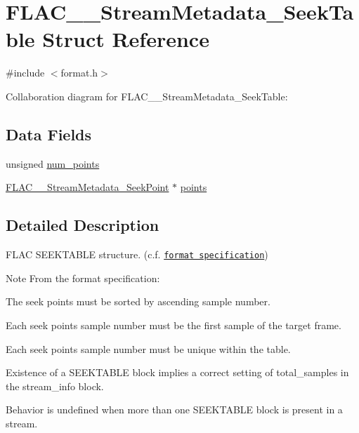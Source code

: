 \hypertarget{struct_f_l_a_c_____stream_metadata___seek_table}{}\section{F\+L\+A\+C\+\_\+\+\_\+\+Stream\+Metadata\+\_\+\+Seek\+Table Struct Reference}
\label{struct_f_l_a_c_____stream_metadata___seek_table}


{\ttfamily \#include $<$format.\+h$>$}



Collaboration diagram for F\+L\+A\+C\+\_\+\+\_\+\+Stream\+Metadata\+\_\+\+Seek\+Table\+:
\subsection*{Data Fields}
\begin{DoxyCompactItemize}
\item 
unsigned \hyperlink{struct_f_l_a_c_____stream_metadata___seek_table_a12dcdb596297c199fe6cffa27a64e69f}{num\+\_\+points}
\item 
\hyperlink{struct_f_l_a_c_____stream_metadata___seek_point}{F\+L\+A\+C\+\_\+\+\_\+\+Stream\+Metadata\+\_\+\+Seek\+Point} $\ast$ \hyperlink{struct_f_l_a_c_____stream_metadata___seek_table_a0bf04ada03ea708dba9d31cd6c6159b8}{points}
\end{DoxyCompactItemize}


\subsection{Detailed Description}
F\+L\+AC S\+E\+E\+K\+T\+A\+B\+LE structure. (c.\+f. \href{../format.html#metadata_block_seektable}{\tt format specification})

\begin{DoxyNote}{Note}
From the format specification\+:
\begin{DoxyItemize}
\item The seek points must be sorted by ascending sample number.
\item Each seek point\textquotesingle{}s sample number must be the first sample of the target frame.
\item Each seek point\textquotesingle{}s sample number must be unique within the table.
\item Existence of a S\+E\+E\+K\+T\+A\+B\+LE block implies a correct setting of total\+\_\+samples in the stream\+\_\+info block.
\item Behavior is undefined when more than one S\+E\+E\+K\+T\+A\+B\+LE block is present in a stream. 
\end{DoxyItemize}
\end{DoxyNote}


